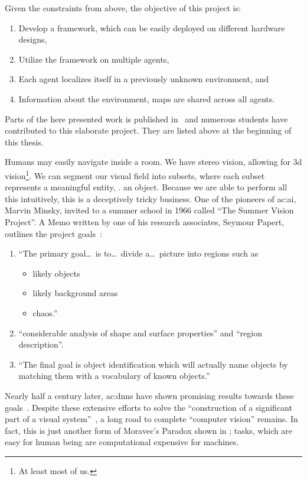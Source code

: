 Given the constraints from above, the objective of this project is:

\begin{enumerate}
  \item Develop a framework, which can be easily deployed on different hardware designs,
  \item Utilize the framework on multiple agents,
  \item Each agent localizes itself in a previously unknown environment, and
  \item Information about the environment, \ie maps are shared across all agents.
\end{enumerate}

Parts of the here presented work is published in~\textcite{reichseerberscheid2018} and numerous students have contributed to this elaborate project.
They are listed above at the beginning of this thesis.

Humans may easily navigate inside a room.
We have stereo vision, allowing for 3d vision\footnote{At least most of us.}.
We can segment our visual field into subsets, where each subset represents a meaningful entity, \eg. an object.
Because we are able to perform all this intuitively, this is a deceptively tricky business.
One of the pioneers of \gls{ac:ai}, Marvin Minsky, invited to a summer school in 1966 called ``The Summer Vision Project''.
A Memo written by one of his research associates, Seymour Papert, outlines the project goals~\cite[p. 2f]{papert1966summer}:

\begin{enumerate}
  \item ``The primary goal\ldots\ is to\ldots\ divide a\ldots\ picture into regions such as
    \begin{itemize}
      \item likely objects
      \item likely background areas
      \item chaos.''
    \end{itemize}
  \item ``considerable analysis of shape and surface properties'' and ``region description''.
  \item ``The final goal is object identification which will actually name objects by matching them with a vocabulary of known objects.''
\end{enumerate}

Nearly half a century later, \glspl{ac:dnn} have shown promising results towards these goals~\cite{krizhevsky2012imagenet, deng2009imagenet, kim2014convolutional}.
Despite these extensive efforts to solve the ``construction of a significant part of a visual system''~\cite[p. 1]{papert1966summer}, a long road to complete ``computer vision'' remains.
In fact, this is just another form of Moravec's Paradox shown in ; tasks, which are easy for human being are computational expensive for machines.

